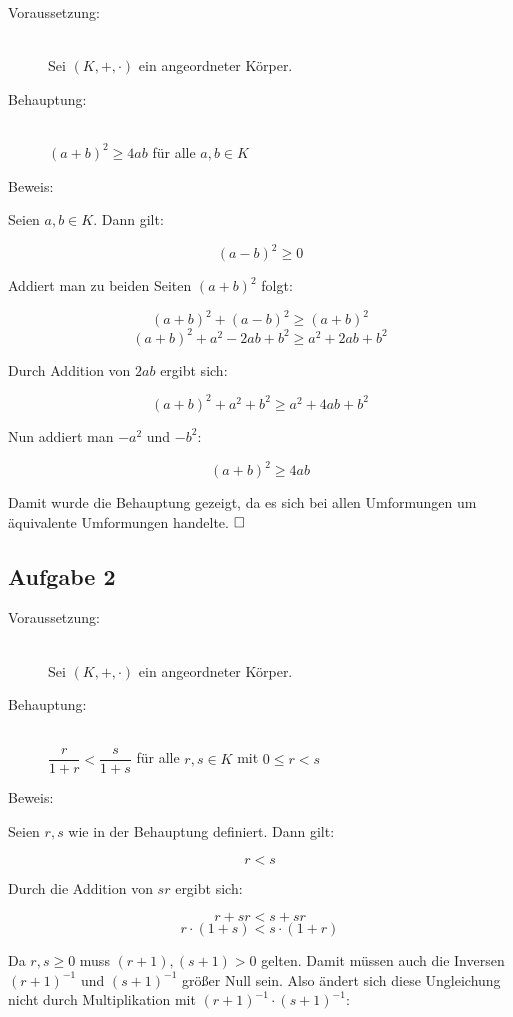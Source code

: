 \documentclass[11pt, a4paper]{article}
\begin{document}
		\begin{description}
			\item[Voraussetzung:] \hfill \\
				Sei $(K,+,\cdot)$ ein angeordneter Körper. \hfill 
			\item[Behauptung:] \hfill \\
				$(a+b)^2 \geq 4ab$ für alle $a,b\in K$ \hfill 
			\item[Beweis:] 
		\end{description}

		Seien $a,b \in K$. Dann gilt:

		\[ (a-b)^2 \geq 0 \]

		Addiert man zu beiden Seiten $(a+b)^2$ folgt:

		\[ (a+b)^2 + (a-b)^2 \geq (a+b)^2 \]
		\[ (a+b)^2 + a^2 -2ab + b^2 \geq a^2 + 2ab + b^2 \]

		Durch Addition von $2ab$ ergibt sich:

		\[ (a+b)^2 + a^2 + b^2 \geq a^2 + 4ab + b^2 \]

		Nun addiert man $-a^2$ und $-b^2$:

		\[ (a+b)^2 \geq 4ab \]

		Damit wurde die Behauptung gezeigt, da es sich bei allen Umformungen um äquivalente Umformungen handelte. $\hfill\Box$ 

	\newpage

	\subsection*{Aufgabe 2}

		\begin{description}
			\item[Voraussetzung:] \hfill \\
				Sei $(K,+,\cdot)$ ein angeordneter Körper. \hfill 
			\item[Behauptung:] \hfill \\
				$\dfrac{r}{1+r} < \dfrac{s}{1+s}$ für alle $r,s\in K$ mit $0\leq r<s$ \hfill 
			\item[Beweis:] 
		\end{description}

		Seien $r,s$ wie in der Behauptung definiert. Dann gilt:

		\[ r < s \]

		Durch die Addition von $sr$ ergibt sich:

		\[ r+sr < s + sr \]
		\[ r\cdot (1+s) < s \cdot (1+r) \]

		Da $r,s \geq 0$ muss $(r+1),(s+1) > 0$ gelten. Damit müssen auch die Inversen $(r+1)^{-1}$ und $(s+1)^{-1}$ größer Null sein.
		Also ändert sich diese Ungleichung nicht durch Multiplikation mit $(r+1)^{-1} \cdot (s+1)^{-1}$:
\end{document}

